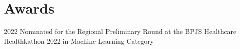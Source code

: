 \documentclass[12pt,letterpaper]{report}
\newcommand{\listitemspace}{0.25em}
\renewenvironment{itemize}
{\begin{list}{}{\setlength{\leftmargin}{0em}
                \setlength{\parskip}{0em}
                \setlength{\itemsep}{\listitemspace}
                \setlength{\parsep}{\listitemspace}}}
{\end{list}}
\begin{document}


    \section*{Awards}
    \begin{tablist}
        \item[2022] \tab{}Nominated for the Regional Preliminary Round at the BPJS Healthcare Healthkathon 2022 in Machine Learning Category
    \end{tablist}


\end{document}
